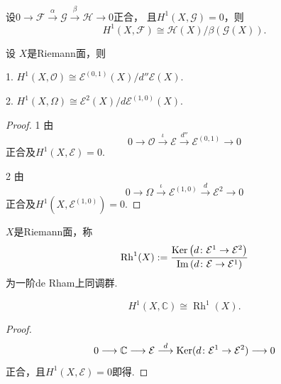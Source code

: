 \begin{theorem}
	设$0\longrightarrow \mathscr{F}\stackrel{\alpha}{\longrightarrow} \mathscr{G} 
    \stackrel{\beta}{\longrightarrow} \mathscr{H}\longrightarrow 0$正合，
    且$H^1(X,\mathscr{G})=0$，则
	$$H^1(X,\mathscr{F})\cong \mathscr{H}(X)/\beta (\mathscr{G}(X)).$$
\end{theorem}

\begin{theorem}[Dolbeault] 设 $X$是Riemann面，则

	1. $H^1(X,\mathcal{O})\cong \mathcal{E}^{(0,1)}(X)/d''\mathcal{E}(X)$.

	2. $H^1(X, \Omega)\cong \mathcal{E}^2(X)/d\mathcal{E}^{(1,0)}(X)$.
\end{theorem}
		
\begin{proof}
	1 由$$0\longrightarrow \mathcal{O} \stackrel{\iota}{\longrightarrow} \mathcal{E} 
    \stackrel{d''}{\longrightarrow} \mathcal{E}^{(0,1)} \longrightarrow 0$$
	正合及$H^1(X,\mathcal{E})=0$.

	2 由$$0\longrightarrow \Omega\stackrel{\iota}{\longrightarrow} \mathcal{E}^{(1,0)} 
    \stackrel{d}{\longrightarrow} \mathcal{E}^2 \longrightarrow 0$$
    正合及$H^1(X,\mathcal{E}^{(1,0)})=0$.
\end{proof}

\begin{definition}
	$X$是Riemann面，称
	$$\operatorname{Rh}^1(X):=\frac{\operatorname{Ker}\left(d\colon \mathcal{E}^1\rightarrow \mathcal{E}^2\right)}
    {\operatorname{Im}\left(d\colon \mathcal{E}\rightarrow \mathcal{E}^1\right)}$$
	为一阶de Rham上同调群.
\end{definition}

\begin{theorem}[de Rham]
	$$H^1(X,\mathbb{C})\cong \operatorname{Rh}^1(X).$$
\end{theorem}

\begin{proof}
	$$0\longrightarrow \mathbb{C} \longrightarrow \mathcal{E} 
    \stackrel{d}{\longrightarrow} \operatorname{Ker}(d\colon \mathcal{E}^1\rightarrow\mathcal{E}^2)\longrightarrow 0$$
	正合，且$H^1(X,\mathcal{E})=0$即得.
\end{proof}